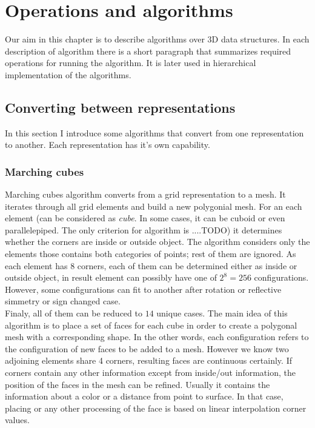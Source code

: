 \chapter{Operations and algorithms}

Our aim in this chapter is to describe algorithms over 3D data structures. In each description of
algorithm there is a short paragraph that summarizes required operations for running the algorithm.
It is later used in hierarchical implementation of the algorithms.

\section{Converting between representations}

In this section I introduce some algorithms that convert from one representation to another. Each 
representation has it's own capability.

\subsection{Marching cubes}

Marching cubes algorithm converts from a grid representation to a mesh. It iterates through
all grid elements and build a new polygonial mesh. For an each element (can be considered as \emph{cube}.
In some cases, it can be cuboid or even parallelepiped. The only criterion for algorithm is ....TODO)
it determines whether the corners are inside or outside object. The algorithm considers only the elements
those contains both categories of points; rest of them are ignored. As each element has 8 corners,
each of them can be determined either as inside or outside object, in result element can possibly
have one of $2^8 = 256$ configurations. However, some configurations can fit to another after rotation
or reflective simmetry or sign changed case.\\

Finaly, all of them can be reduced to $14$ unique cases. The main idea of this algorithm is to
place a set of faces for each cube in order to create a polygonal mesh with a corresponding shape.
In the other words, each configuration refers to the configuration of new faces to be added to a mesh.
However we know two adjoining elements share 4 corners, resulting faces are continuous certainly.
If corners contain any other information except from inside/out information, the position of 
the faces in the mesh can be refined. Usually it contains the information about a color or
a distance from point to surface. In that case, placing or any other processing of
the face is based on linear interpolation corner values.\\

